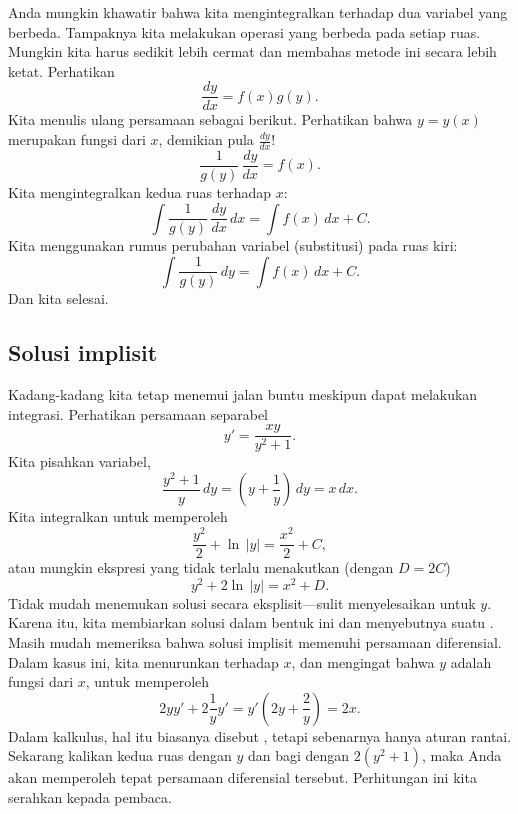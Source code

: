 Anda mungkin khawatir bahwa kita
mengintegralkan terhadap dua variabel yang berbeda.
Tampaknya kita melakukan operasi yang berbeda pada setiap ruas.
Mungkin kita harus sedikit lebih cermat
dan membahas metode ini secara lebih ketat.
Perhatikan
\begin{equation*}
\frac{dy}{dx} = f(x)g(y) .
\end{equation*}
Kita menulis ulang persamaan sebagai berikut.
Perhatikan bahwa $y = y(x)$ merupakan fungsi dari $x$, demikian pula
$\frac{dy}{dx}$!
\begin{equation*}
\frac{1}{g(y)}\,\frac{dy}{dx} = f(x) .
\end{equation*}
Kita mengintegralkan kedua ruas terhadap $x$:
\begin{equation*}
\int \frac{1}{g(y)}\,\frac{dy}{dx} \,dx = \int f(x) \,dx + C .
\end{equation*}
Kita menggunakan rumus perubahan variabel (substitusi) pada ruas kiri:
\begin{equation*}
\int \frac{1}{g(y)}\,dy = \int f(x) \,dx + C .
\end{equation*}
Dan kita selesai.

\subsection{Solusi implisit}

Kadang-kadang kita tetap menemui jalan buntu meskipun dapat melakukan
integrasi.  Perhatikan persamaan separabel
\begin{equation*}
y' = \frac{xy}{y^2+1} .
\end{equation*}
Kita pisahkan variabel,
\begin{equation*}
\frac{y^2+1}{y}\,dy = \left(y+\frac{1}{y}\right)\,dy = x\,dx .
\end{equation*}
Kita integralkan untuk memperoleh
\begin{equation*}
\frac{y^2}{2} + \ln \, \lvert y \rvert = \frac{x^2}{2} + C ,
\end{equation*}
atau mungkin ekspresi yang tidak terlalu menakutkan (dengan $D = 2C$)
\begin{equation*}
y^2 + 2 \ln \, \lvert y\rvert = x^2 + D .
\end{equation*}
Tidak mudah menemukan solusi secara eksplisit---sulit menyelesaikan
untuk $y$.  Karena itu, kita membiarkan solusi dalam bentuk ini dan menyebutnya
suatu
\emph{}.
Masih
mudah memeriksa bahwa solusi implisit memenuhi persamaan
diferensial.  Dalam kasus ini, kita menurunkan terhadap $x$, dan mengingat
bahwa $y$ adalah fungsi dari $x$,
untuk memperoleh
\begin{equation*}
2y y' + 2 \frac{1}{y} y'
=
y'\left(2y + \frac{2}{y}\right) = 2x .
\end{equation*}
Dalam kalkulus, hal itu biasanya disebut ,
tetapi sebenarnya hanya aturan rantai.
Sekarang
kalikan kedua ruas dengan $y$ dan bagi dengan $2(y^2+1)$, maka Anda akan
memperoleh tepat persamaan diferensial tersebut.  Perhitungan ini kita serahkan kepada
pembaca.

